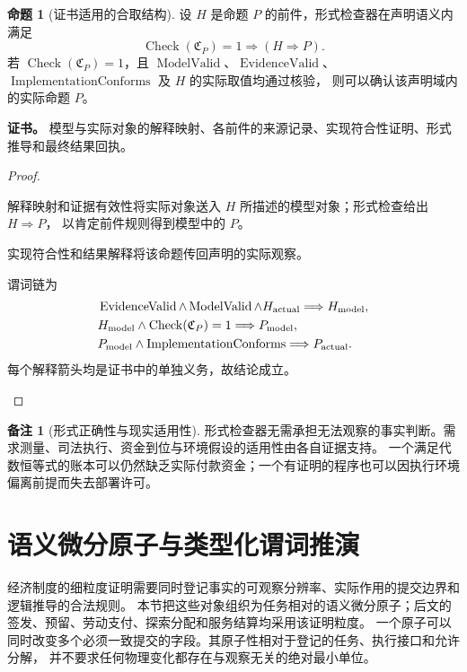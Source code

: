 \documentclass[UTF8,12pt,a4paper,openany,fontset=none,zihao=false]{ctexrep}
\theoremstyle{definition}
\newtheorem{proposition}{命题}[chapter]
\newtheorem{remark}{备注}[chapter]
\newenvironment{certificate}{\par\noindent\textbf{证书。}\ignorespaces}{\par}
\newcommand{\1}{\mathbf 1}
\begin{document}
\begin{proposition}[证书适用的合取结构]
\label{base:certificate}
设 \(H\) 是命题 \(P\) 的前件，形式检查器在声明语义内满足
\[
\operatorname{Check}(\mathfrak C_P)=1\Longrightarrow (H\Rightarrow P).
\]
若 \(\operatorname{Check}(\mathfrak C_P)=1\)，且 \(\operatorname{ModelValid}\)、\(\operatorname{EvidenceValid}\)、\(\operatorname{ImplementationConforms}\) 及 \(H\) 的实际取值均通过核验，
则可以确认该声明域内的实际命题 \(P\)。
\end{proposition}
\begin{certificate}
模型与实际对象的解释映射、各前件的来源记录、实现符合性证明、形式推导和最终结果回执。
\end{certificate}
\begin{proof}
\begin{semanticsteps}
\item 解释映射和证据有效性将实际对象送入 \(H\) 所描述的模型对象；形式检查给出 \(H\Rightarrow P\)，
以肯定前件规则得到模型中的 \(P\)。
\item 实现符合性和结果解释将该命题传回声明的实际观察。
\item 谓词链为
\[
\begin{aligned}
&\operatorname{EvidenceValid}\land\operatorname{ModelValid}\land H_{\rm actual}
\Longrightarrow H_{\rm model},\\
&H_{\rm model}\land\operatorname{Check}(\mathfrak C_P)=1
\Longrightarrow P_{\rm model},\\
&P_{\rm model}\land\operatorname{ImplementationConforms}
\Longrightarrow P_{\rm actual}.
\end{aligned}
\]
每个解释箭头均是证书中的单独义务，故结论成立。
\end{semanticsteps}
\end{proof}

\begin{remark}[形式正确性与现实适用性]
形式检查器无需承担无法观察的事实判断。需求测量、司法执行、资金到位与环境假设的适用性由各自证据支持。
一个满足代数恒等式的账本可以仍然缺乏实际付款资金；一个有证明的程序也可以因执行环境偏离前提而失去部署许可。
\end{remark}

\section{语义微分原子与类型化谓词推演}
\label{atom:section}

经济制度的细粒度证明需要同时登记事实的可观察分辨率、实际作用的提交边界和逻辑推导的合法规则。
本节把这些对象组织为任务相对的语义微分原子；后文的签发、预留、劳动支付、探索分配和服务结算均采用该证明粒度。
一个原子可以同时改变多个必须一致提交的字段。其原子性相对于登记的任务、执行接口和允许分解，
并不要求任何物理变化都存在与观察无关的绝对最小单位。
\end{document}
